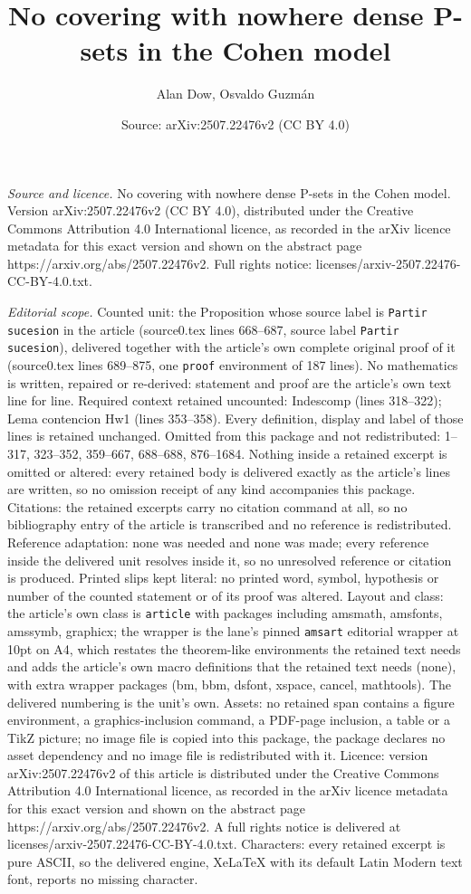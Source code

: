 \documentclass[10pt,a4paper]{amsart}
\title[No covering with nowhere dense \textsf{P}-sets in the Cohen ]{No covering with nowhere dense \textsf{P}-sets in the Cohen model}
\author{Alan Dow, Osvaldo Guzm\'an}
\date{Source: arXiv:2507.22476v2 (CC BY 4.0)}
\begin{document}
\maketitle

\noindent\emph{Source and licence.} No covering with nowhere dense \textsf{P}-sets in the Cohen model. Version arXiv:2507.22476v2 (CC BY 4.0), distributed under the Creative Commons Attribution 4.0 International licence, as recorded in the arXiv licence metadata for this exact version and shown on the abstract page https://arxiv.org/abs/2507.22476v2. Full rights notice: licenses/arxiv-2507.22476-CC-BY-4.0.txt.\par\smallskip

\noindent\textit{Editorial scope.} Counted unit: the Proposition whose source label is \texttt{Partir sucesion} in the article (source0.tex lines 668--687, source label \texttt{Partir sucesion}), delivered together with the article's own complete original proof of it (source0.tex lines 689--875, one \texttt{proof} environment of 187 lines). No mathematics is written, repaired or re-derived: statement and proof are the article's own text line for line. Required context retained uncounted: Indescomp (lines 318--322); Lema contencion Hw1 (lines 353--358). Every definition, display and label of those lines is retained unchanged. Omitted from this package and not redistributed: 1--317, 323--352, 359--667, 688--688, 876--1684. Nothing inside a retained excerpt is omitted or altered: every retained body is delivered exactly as the article's lines are written, so no omission receipt of any kind accompanies this package. Citations: the retained excerpts carry no citation command at all, so no bibliography entry of the article is transcribed and no reference is redistributed. Reference adaptation: none was needed and none was made; every reference inside the delivered unit resolves inside it, so no unresolved reference or citation is produced. Printed slips kept literal: no printed word, symbol, hypothesis or number of the counted statement or of its proof was altered. Layout and class: the article's own class is \texttt{article} with packages including amsmath, amsfonts, amssymb, graphicx; the wrapper is the lane's pinned \texttt{amsart} editorial wrapper at 10pt on A4, which restates the theorem-like environments the retained text needs and adds the article's own macro definitions that the retained text needs (none), with extra wrapper packages (bm, bbm, dsfont, xspace, cancel, mathtools). The delivered numbering is the unit's own. Assets: no retained span contains a figure environment, a graphics-inclusion command, a PDF-page inclusion, a table or a TikZ picture; no image file is copied into this package, the package declares no asset dependency and no image file is redistributed with it. Licence: version arXiv:2507.22476v2 of this article is distributed under the Creative Commons Attribution 4.0 International licence, as recorded in the arXiv licence metadata for this exact version and shown on the abstract page https://arxiv.org/abs/2507.22476v2. A full rights notice is delivered at licenses/arxiv-2507.22476-CC-BY-4.0.txt. Characters: every retained excerpt is pure ASCII, so the delivered engine, XeLaTeX with its default Latin Modern text font, reports no missing character.
\end{document}
